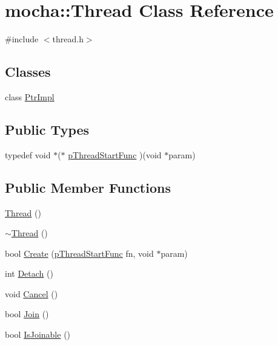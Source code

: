 \hypertarget{classmocha_1_1_thread}{
\section{mocha::Thread Class Reference}
\label{classmocha_1_1_thread}
}


{\ttfamily \#include $<$thread.h$>$}

\subsection*{Classes}
\begin{DoxyCompactItemize}
\item 
class \hyperlink{classmocha_1_1_thread_1_1_ptr_impl}{PtrImpl}
\end{DoxyCompactItemize}
\subsection*{Public Types}
\begin{DoxyCompactItemize}
\item 
typedef void $\ast$($\ast$ \hyperlink{classmocha_1_1_thread_a916d7338f2a6d6ae046f89c9d46b0afa}{pThreadStartFunc} )(void $\ast$param)
\end{DoxyCompactItemize}
\subsection*{Public Member Functions}
\begin{DoxyCompactItemize}
\item 
\hyperlink{classmocha_1_1_thread_a9ea8ef7102da8ce33491efec7b9c1e68}{Thread} ()
\item 
\hyperlink{classmocha_1_1_thread_a52b752dec303d5fedac65897a19bfca9}{$\sim$Thread} ()
\item 
bool \hyperlink{classmocha_1_1_thread_a4a21be27c5ff516fa3ca3c4f4a898e98}{Create} (\hyperlink{classmocha_1_1_thread_a916d7338f2a6d6ae046f89c9d46b0afa}{pThreadStartFunc} fn, void $\ast$param)
\item 
int \hyperlink{classmocha_1_1_thread_a8717524989bdad01ab8728de0161e6be}{Detach} ()
\item 
void \hyperlink{classmocha_1_1_thread_a778abf830747742fcc27f7b60c6b7451}{Cancel} ()
\item 
bool \hyperlink{classmocha_1_1_thread_ab44e0a91ed358da7f73d1b210ca2f081}{Join} ()
\item 
bool \hyperlink{classmocha_1_1_thread_a85939c313e4ea7bef6af778ecd4f1129}{IsJoinable} ()
\end{DoxyCompactItemize}
